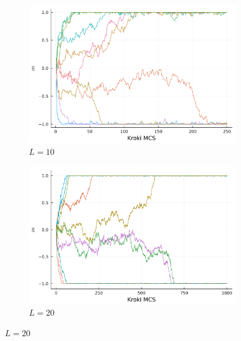 \documentclass[12pt]{article}
\begin{document}
\begin{figure}[H]
  \centering

  \begin{subfigure}[b]{0.45\linewidth}
    \centering
	\centerline{\includegraphics[scale=0.45]{../data/magnetizations/10.png}}
	\caption{$L=10$}
    \label{fig:image1}
  \end{subfigure}
  \hfill
  \begin{subfigure}[b]{0.45\linewidth}
    \centering
	\includegraphics[scale=0.45]{../data/magnetizations/20.png}
	\caption{$L=20$}
    \label{fig:image2}
  \end{subfigure}

  \label{fig:series}
\end{figure}
\end{document}

